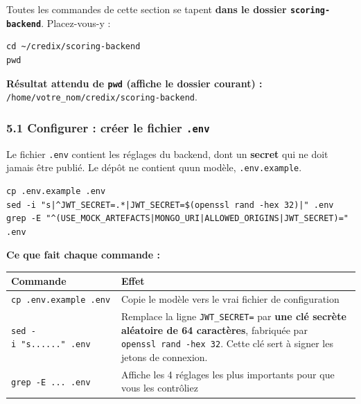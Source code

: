 \documentclass[
  french,
  11pt,
  a4paper,
]{article}
\begin{document}
Toutes les commandes de cette section se tapent \textbf{dans le dossier
\texttt{scoring-\allowbreak{}backend}}. Placez-vous-y :

\begin{Verbatim}[breaklines=true,breakanywhere=true,fontsize=\small,frame=leftline,framerule=1.6pt,rulecolor=\color{credixblue},framesep=3mm,xleftmargin=2mm,xrightmargin=1mm]
cd ~/credix/scoring-backend
pwd
\end{Verbatim}

\textbf{Résultat attendu de \texttt{pwd} (affiche le dossier courant) :}
\texttt{/\allowbreak{}home/\allowbreak{}votre\_\allowbreak{}nom/\allowbreak{}credix/\allowbreak{}scoring-\allowbreak{}backend}.

\subsubsection{\texorpdfstring{5.1 Configurer : créer le fichier
\texttt{.env}}{5.1 Configurer : créer le fichier .env}}\label{51-configurer--cruxe9er-le-fichier-env}

Le fichier \texttt{.env} contient les réglages du backend, dont un
\textbf{secret} qui ne doit jamais être publié. Le dépôt ne contient
qu\textquotesingle un modèle, \texttt{.env.example}.

\begin{Verbatim}[breaklines=true,breakanywhere=true,fontsize=\small,frame=leftline,framerule=1.6pt,rulecolor=\color{credixblue},framesep=3mm,xleftmargin=2mm,xrightmargin=1mm]
cp .env.example .env
sed -i "s|^JWT_SECRET=.*|JWT_SECRET=$(openssl rand -hex 32)|" .env
grep -E "^(USE_MOCK_ARTEFACTS|MONGO_URI|ALLOWED_ORIGINS|JWT_SECRET)=" .env
\end{Verbatim}

\textbf{Ce que fait chaque commande :}

\begin{longtable}[]{@{}
  >{\raggedright\arraybackslash}p{}
  >{\raggedright\arraybackslash}p{}@{}}
\toprule\noalign{}
\begin{minipage}[b]{\linewidth}\raggedright
Commande
\end{minipage} & \begin{minipage}[b]{\linewidth}\raggedright
Effet
\end{minipage} \\
\midrule\noalign{}
\endhead
\bottomrule\noalign{}
\endlastfoot
\texttt{cp\ .\allowbreak{}env.\allowbreak{}example\ .\allowbreak{}env} &
Copie le modèle vers le vrai fichier de configuration \\
\texttt{sed\ -i\ "s\textbar{}...\textbar{}...\textbar{}"\ .env} &
Remplace la ligne \texttt{JWT\_SECRET=} par \textbf{une clé secrète
aléatoire de 64 caractères}, fabriquée par
\texttt{openssl\ rand\ -\allowbreak{}hex\ 32}. Cette clé sert à signer
les jetons de connexion. \\
\texttt{grep\ -\allowbreak{}E\ .\allowbreak{}.\allowbreak{}.\allowbreak{}\ .\allowbreak{}env}
& Affiche les 4 réglages les plus importants pour que vous les
contrôliez \\
\end{longtable}
\end{document}

